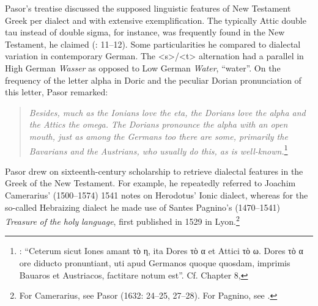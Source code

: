 Pasor’s treatise discussed the supposed linguistic features of New Testament Greek per dialect and with extensive exemplification. The typically Attic double tau instead of double sigma, for instance, was frequently found in the New Testament, he claimed (\citealt{Pasor1632}: 11–12). Some particularities he compared to dialectal variation in contemporary German. The <s>/<t> alternation had a parallel in High German \textit{Wasser} as opposed to Low German \textit{Water}, “water”. On the frequency of the letter alpha in Doric and the peculiar Dorian pronunciation of this letter, Pasor remarked:

\begin{quote}
\emph{\textup{Besides,} \emph{much} \emph{as} \emph{the} \emph{Ionians} \emph{love} \emph{the} \emph{eta,} \emph{the} \emph{Dorians} \emph{love} \emph{the} \emph{alpha} \emph{and} \emph{the} \emph{Attics} \emph{the} \emph{omega.} \emph{The} \emph{Dorians} \emph{pronounce} \emph{the} \emph{alpha} \emph{with} \emph{an} \emph{open} \emph{mouth,} \emph{just} \emph{as} \emph{among} \emph{the} \emph{Germans} \emph{too} \emph{there} \emph{are} \emph{some,} \emph{primarily} \emph{the} \emph{Bavarians} \emph{and} \emph{the} \emph{Austrians,} \emph{who} \emph{usually} \emph{do} \emph{this,} \emph{as} \emph{is} \emph{well-known.}}\footnote{\citet[28]{Pasor1632}: “Ceterum sicut Iones amant τὸ η, ita Dores τὸ α et Attici τὸ ω. Dores τὸ α ore diducto pronuntiant, uti apud Germanos quoque quosdam, imprimis Bauaros et Austriacos, factitare notum est”. Cf. Chapter 8, }
\end{quote}

Pasor drew on sixteenth-century scholarship to retrieve dialectal features in the Greek of the New Testament. For example, he repeatedly referred to Joachim Camerarius’ (1500–1574) 1541 notes on Herodotus’ Ionic dialect, whereas for the so-called Hebraizing dialect he made use of Santes Pagnino’s (1470–1541) \textit{Treasure} \textit{of} \textit{the} \textit{holy} \textit{language}, first published in 1529 in Lyon.\footnote{For Camerarius, see Pasor (1632: 24–25, 27–28). For Pagnino, see \citet[36]{Pasor1632}.}

